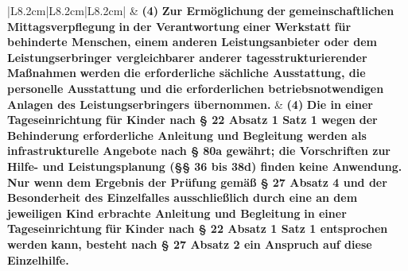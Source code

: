 \documentclass[10pt,a4paper,landscape]{article}
\begin{document}
\begin{longtable}{|L{8.2cm}|L{8.2cm}|L{8.2cm}|}
 & \textbf{(4) }\textbf{\textcolor{diffred}{Zur Ermöglichung}}\textbf{ der} \newline \textbf{\textcolor{diffred}{gemeinschaftlichen Mittagsverpflegung}}\textbf{  \newline in }\textbf{\textcolor{diffred}{der Verantwortung}}\textbf{ einer }\textbf{\textcolor{diffred}{Werkstatt}}\textbf{ für} \newline \textbf{\textcolor{diffred}{behinderte Menschen, einem anderen  \newline Leistungsanbieter oder dem  \newline Leistungserbringer vergleichbarer  \newline anderer tagesstrukturierender  \newline Maßnahmen}}\textbf{ werden }\textbf{\textcolor{diffred}{die erforderliche  \newline sächliche Ausstattung, die personelle  \newline Ausstattung und die erforderlichen  \newline betriebsnotwendigen Anlagen des  \newline Leistungserbringers übernommen.}} & \textbf{(4) }\textbf{\textcolor{diffgreen}{Die in einer Tageseinrichtung für  \newline Kinder nach \S{} 22 Absatz 1 Satz 1 wegen}}\textbf{  \newline der }\textbf{\textcolor{diffgreen}{Behinderung erforderliche Anleitung  \newline und Begleitung werden als  \newline infrastrukturelle Angebote nach \S{} 80a }} \textbf{\textcolor{diffgreen}{gewährt; die Vorschriften zur Hilfe- und  \newline Leistungsplanung (\S{}\S{} 36 bis 38d) finden  \newline keine Anwendung. Nur wenn dem  \newline Ergebnis der Prüfung gemäß \S{} 27  \newline Absatz 4 und der Besonderheit des  \newline Einzelfalles ausschließlich durch eine  \newline an dem jeweiligen Kind erbrachte  \newline Anleitung und Begleitung}}\textbf{  in einer} \newline \textbf{\textcolor{diffgreen}{Tageseinrichtung}}\textbf{ für }\textbf{\textcolor{diffgreen}{Kinder nach \S{} 22  \newline Absatz 1 Satz 1 entsprochen}}\textbf{ werden} \newline \textbf{\textcolor{diffgreen}{kann, besteht nach \S{} 27 Absatz 2 ein  \newline Anspruch auf diese Einzelhilfe.}} \\

\end{longtable}
\end{document}
